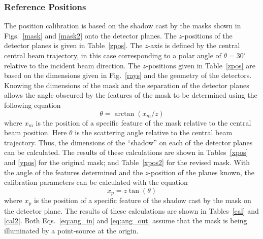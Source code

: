 \subsubsection{Reference Positions}
\label{cal_def}
The position calibration is based on the shadow cast by the masks shown in Figs.~\ref{mask} and \ref{mask2} onto the detector planes.  The $z$-positions of the detector planes is given in Table~\ref{zpos}.  The $z$-axis is defined by the central central beam trajectory, in this case corresponding to a polar angle of $\theta=30^\circ$ relative to the incident beam direction.
The $z$-positions given in Table~\ref{zpos} are based on the dimensions given in Fig.~\ref{rays} and the geometry of the detectors.  Knowing the dimensions of the mask and the separation of the detector planes allows the angle obscured by the features of the mask to be determined using the following equation
\begin{equation}
\theta=\arctan(x_m/z)
\label{eq:ang_in}
\end{equation}
where $x_m$ is the position of a specific feature of the mask relative to the central beam position.  Here $\theta$ is the scattering angle relative to the central beam trajectory.  Thus, the dimensions of the ``shadow'' on each of the detector planes can be calculated.    The results of these calculations are shown in Tables~\ref{xpos} and \ref{ypos} for the original mask; and Table~\ref{xpos2}  for the revised mask.  With the angle of the features determined and the $z$-position of the planes known, the calibration parameters can be calculated with the equation
\begin{equation}
x_p=z\tan(\theta)
\label{eq:ang_out}
\end{equation}
where $x_p$ is the position of a specific feature of the shadow cast by the mask on the detector plane.  The results of these calculations are shown in Tables~\ref{cal} and \ref{cal2}.  Both Eqs.~\ref{eq:ang_in} and \ref{eq:ang_out} assume that the mask is being illuminated by a point-source at the origin.
